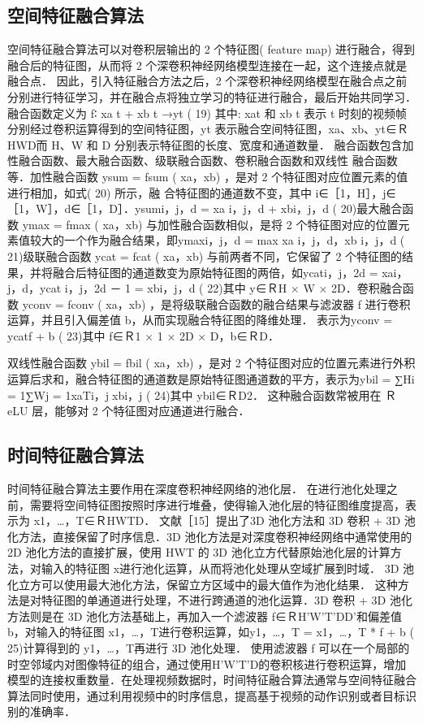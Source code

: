 \subsection{空间特征融合算法}
空间特征融合算法可以对卷积层输出的 2 个特征图( feature map) 进行融合，得到融合后的特征图，从而将 2 个深卷积神经网络模型连接在一起，这个连接点就是融合点． 因此，引入特征融合方法之后，2 个深卷积神经网络模型在融合点之前分别进行特征学习，并在融合点将独立学习的特征进行融合，最后开始共同学习． 融合函数定义为
f∶ xa
t + xb
t →yt ( 19)
其中: xat 和 xb
t 表示 t 时刻的视频帧分别经过卷积运算得到的空间特征图，yt 表示融合空间特征图，xa、xb、yt∈ＲHWD而 H、W 和 D 分别表示特征图的长度、宽度和通道数量． 融合函数包含加性融合函数、最大融合函数、级联融合函数、卷积融合函数和双线性
融合函数等．加性融合函数 ysum = fsum ( xa，xb) ，是对 2 个特征图对应位置元素的值进行相加，如式( 20) 所示，融
合特征图的通道数不变，其中 i∈［1，H］，j∈［1，W］，d∈［1，D］．ysumi，j，d = xa
i，j，d + xbi，j，d ( 20)最大融合函数 ymax = fmax ( xa，xb) 与加性融合函数相似，是将 2 个特征图对应的位置元素值较大的一个作为融合结果，即ymaxi，j，d = max{ xa	i，j，d，xb	i，j，d } ( 21)级联融合函数 ycat = fcat ( xa，xb) 与前两者不同，它保留了 2 个特征图的结果，并将融合后特征图的通道数变为原始特征图的两倍，如ycati，j，2d = xai，j，d，ycat
i，j，2d － 1 = xbi，j，d ( 22)其中 y∈ＲH × W × 2D．卷积融合函数 yconv = fconv ( xa，xb) ，是将级联融合函数的融合结果与滤波器 f 进行卷积运算，并且引入偏差值 b，从而实现融合特征图的降维处理． 表示为yconv = ycatf + b ( 23)其中 f∈Ｒ1 × 1 × 2D × D，b∈ＲD．

双线性融合函数 ybil = fbil ( xa，xb) ，是对 2 个特征图对应的位置元素进行外积运算后求和，融合特征图的通道数是原始特征图通道数的平方，表示为ybil = ∑Hi = 1∑Wj = 1xaTi，jxbi，j ( 24)其中 ybil∈ＲD2． 这种融合函数常被用在 ＲeLU 层，能够对 2 个特征图对应通道进行融合．

\subsection{时间特征融合算法}

时间特征融合算法主要作用在深度卷积神经网络的池化层． 在进行池化处理之前，需要将空间特征图按照时序进行堆叠，使得输入池化层的特征图维度提高，表示为 x1，…，T∈ＲHWTD． 文献［15］提出了3D 池化方法和 3D 卷积 + 3D 池化方法，直接保留了时序信息．3D 池化方法是对深度卷积神经网络中通常使用的 2D 池化方法的直接扩展，使用 HWT 的 3D 池化立方代替原始池化层的计算方法，对输入的特征图 x进行池化运算，从而将池化处理从空域扩展到时域． 3D 池化立方可以使用最大池化方法，保留立方区域中的最大值作为池化结果． 这种方法是对特征图的单通道进行处理，不进行跨通道的池化运算．3D 卷积 + 3D 池化方法则是在 3D 池化方法基础上，再加入一个滤波器 f∈ＲH'W'T'DD'和偏差值 b，对输入的特征图 x1，…，T进行卷积运算，如y1，…，T = x1，…，T * f + b ( 25)计算得到的 y1，…，T再进行 3D 池化处理． 使用滤波器 f 可以在一个局部的时空邻域内对图像特征的组合，通过使用H'W'T'D的卷积核进行卷积运算，增加模型的连接权重数量．在处理视频数据时，时间特征融合算法通常与空间特征融合算法同时使用，通过利用视频中的时序信息，提高基于视频的动作识别或者目标识别的准确率．


